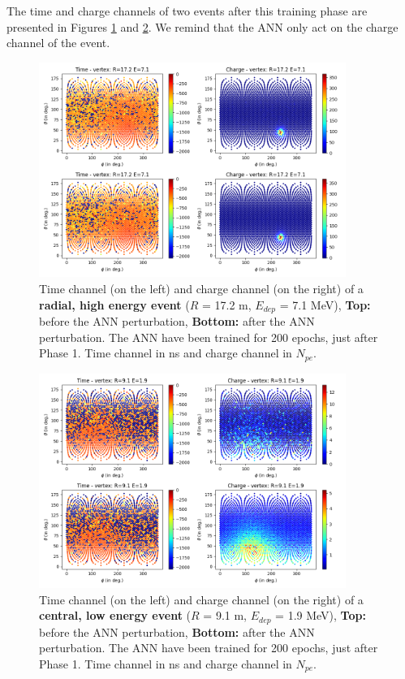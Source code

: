 \documentclass[../main.tex]{subfiles}
\begin{document}
The time and charge channels of two events after this training phase are presented in Figures \ref{fig:janne:hr_he_200} and \ref{fig:janne:lr_le_200}. We remind that the ANN only act on  the charge channel of the event.
\begin{figure}[ht]
  \centering
  \includegraphics[height=7cm]{images/janne/events/hr_he_200.png}
  \caption{Time channel (on the left) and charge channel (on the right) of a \textbf{radial, high energy event} ($R$ = 17.2 m, $E_{dep}$ = 7.1 MeV), \textbf{Top:} before the ANN perturbation, \textbf{Bottom:} after the ANN perturbation. The ANN have been trained for 200 epochs, just after Phase 1. Time channel in ns and charge channel in $N_{pe}$.}
  \label{fig:janne:hr_he_200}
\end{figure}

\begin{figure}[ht]
  \centering
  \includegraphics[height=7cm]{images/janne/events/lr_le_200.png}
  \caption{Time channel (on the left) and charge channel (on the right) of a \textbf{central, low energy event} ($R$ = 9.1 m, $E_{dep}$ = 1.9 MeV), \textbf{Top:} before the ANN perturbation, \textbf{Bottom:} after the ANN perturbation. The ANN have been trained for 200 epochs, just after Phase 1. Time channel in ns and charge channel in $N_{pe}$.}
  \label{fig:janne:lr_le_200}
\end{figure}
\end{document}
